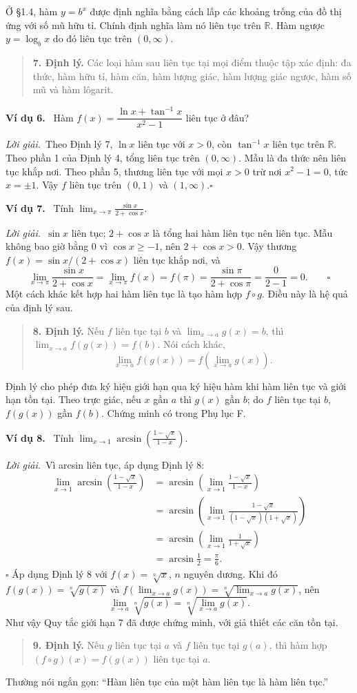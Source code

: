 \documentclass[12pt,a4paper]{article}
\newcommand{\ex}[1]{\par\medskip\noindent\textbf{Ví dụ #1.}\ }
\newcommand{\sol}{\par\noindent\textit{Lời giải.}\ }
\begin{document}
Ở §1.4, hàm $y=b^x$ được định nghĩa bằng cách lấp các khoảng trống của đồ thị ứng với số mũ hữu tỉ. Chính định nghĩa làm nó liên tục trên $\mathbb R$. Hàm ngược $y=\log_bx$ do đó liên tục trên $(0,\infty)$.
\begin{quote}\textbf{7. Định lý.} Các loại hàm sau liên tục tại mọi điểm thuộc tập xác định: đa thức, hàm hữu tỉ, hàm căn, hàm lượng giác, hàm lượng giác ngược, hàm số mũ và hàm lôgarit.\end{quote}
\ex{6} Hàm $f(x)=\dfrac{\ln x+\tan^{-1}x}{x^2-1}$ liên tục ở đâu?
\sol Theo Định lý 7, $\ln x$ liên tục với $x>0$, còn $\tan^{-1}x$ liên tục trên $\mathbb R$. Theo phần 1 của Định lý 4, tổng liên tục trên $(0,\infty)$. Mẫu là đa thức nên liên tục khắp nơi. Theo phần 5, thương liên tục với mọi $x>0$ trừ nơi $x^2-1=0$, tức $x=\pm1$. Vậy $f$ liên tục trên $(0,1)$ và $(1,\infty)$.\hfill$\square$
\ex{7} Tính $\displaystyle\lim_{x\to\pi}\frac{\sin x}{2+\cos x}$.
\sol $\sin x$ liên tục; $2+\cos x$ là tổng hai hàm liên tục nên liên tục. Mẫu không bao giờ bằng 0 vì $\cos x\ge-1$, nên $2+\cos x>0$. Vậy thương $f(x)=\sin x/(2+\cos x)$ liên tục khắp nơi, và
\[\lim_{x\to\pi}\frac{\sin x}{2+\cos x}=\lim_{x\to\pi}f(x)=f(\pi)=\frac{\sin\pi}{2+\cos\pi}=\frac0{2-1}=0.\qquad\square\]
Một cách khác kết hợp hai hàm liên tục là tạo hàm hợp $f\circ g$. Điều này là hệ quả của định lý sau.
\begin{quote}\textbf{8. Định lý.} Nếu $f$ liên tục tại $b$ và $\lim_{x\to a}g(x)=b$, thì $\lim_{x\to a}f(g(x))=f(b)$. Nói cách khác,
\[\lim_{x\to a}f(g(x))=f\left(\lim_{x\to a}g(x)\right).\]
\end{quote}
Định lý cho phép đưa ký hiệu giới hạn qua ký hiệu hàm khi hàm liên tục và giới hạn tồn tại. Theo trực giác, nếu $x$ gần $a$ thì $g(x)$ gần $b$; do $f$ liên tục tại $b$, $f(g(x))$ gần $f(b)$. Chứng minh có trong Phụ lục F.
\ex{8} Tính $\displaystyle\lim_{x\to1}\arcsin\left(\frac{1-\sqrt{x}}{1-x}\right)$.
\sol Vì arcsin liên tục, áp dụng Định lý 8:
\begin{align*}
\lim_{x\to1}\arcsin\left(\frac{1-\sqrt{x}}{1-x}\right)
&=\arcsin\left(\lim_{x\to1}\frac{1-\sqrt{x}}{1-x}\right)\\
&=\arcsin\left(\lim_{x\to1}\frac{1-\sqrt{x}}{(1-\sqrt{x})(1+\sqrt{x})}\right)\\
&=\arcsin\left(\lim_{x\to1}\frac1{1+\sqrt{x}}\right)\\
&=\arcsin\frac12=\frac\pi6.
\end{align*}\hfill$\square$
Áp dụng Định lý 8 với $f(x)=\sqrt[n]{x}$, $n$ nguyên dương. Khi đó $f(g(x))=\sqrt[n]{g(x)}$ và $f(\lim_{x\to a}g(x))=\sqrt[n]{\lim_{x\to a}g(x)}$, nên
\[\lim_{x\to a}\sqrt[n]{g(x)}=\sqrt[n]{\lim_{x\to a}g(x)}.\]
Như vậy Quy tắc giới hạn 7 đã được chứng minh, với giả thiết các căn tồn tại.
\begin{quote}\textbf{9. Định lý.} Nếu $g$ liên tục tại $a$ và $f$ liên tục tại $g(a)$, thì hàm hợp $(f\circ g)(x)=f(g(x))$ liên tục tại $a$.\end{quote}
Thường nói ngắn gọn: ``Hàm liên tục của một hàm liên tục là hàm liên tục.''
\end{document}
